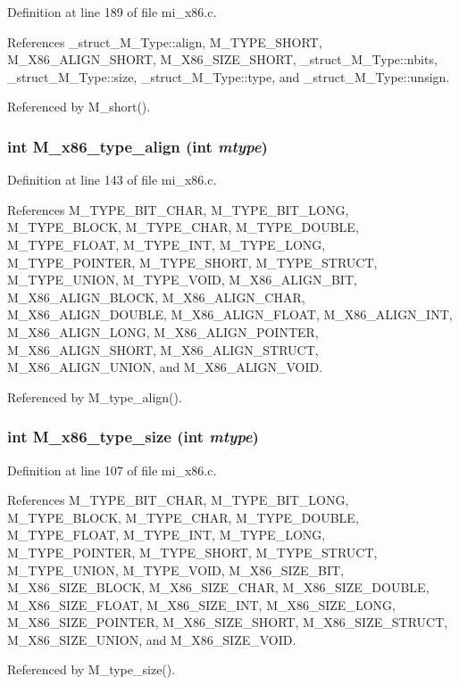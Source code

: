 Definition at line 189 of file mi\_\-x86.c.

References \_\-struct\_\-M\_\-Type::align, M\_\-TYPE\_\-SHORT, M\_\-X86\_\-ALIGN\_\-SHORT, M\_\-X86\_\-SIZE\_\-SHORT, \_\-struct\_\-M\_\-Type::nbits, \_\-struct\_\-M\_\-Type::size, \_\-struct\_\-M\_\-Type::type, and \_\-struct\_\-M\_\-Type::unsign.

Referenced by M\_\-short().
\subsubsection{\setlength{\rightskip}{0pt plus 5cm}int M\_\-x86\_\-type\_\-align (int {\em mtype})}\label{mi__x86_8c_41c11852de71a65093dfa7b06640e1ba}




Definition at line 143 of file mi\_\-x86.c.

References M\_\-TYPE\_\-BIT\_\-CHAR, M\_\-TYPE\_\-BIT\_\-LONG, M\_\-TYPE\_\-BLOCK, M\_\-TYPE\_\-CHAR, M\_\-TYPE\_\-DOUBLE, M\_\-TYPE\_\-FLOAT, M\_\-TYPE\_\-INT, M\_\-TYPE\_\-LONG, M\_\-TYPE\_\-POINTER, M\_\-TYPE\_\-SHORT, M\_\-TYPE\_\-STRUCT, M\_\-TYPE\_\-UNION, M\_\-TYPE\_\-VOID, M\_\-X86\_\-ALIGN\_\-BIT, M\_\-X86\_\-ALIGN\_\-BLOCK, M\_\-X86\_\-ALIGN\_\-CHAR, M\_\-X86\_\-ALIGN\_\-DOUBLE, M\_\-X86\_\-ALIGN\_\-FLOAT, M\_\-X86\_\-ALIGN\_\-INT, M\_\-X86\_\-ALIGN\_\-LONG, M\_\-X86\_\-ALIGN\_\-POINTER, M\_\-X86\_\-ALIGN\_\-SHORT, M\_\-X86\_\-ALIGN\_\-STRUCT, M\_\-X86\_\-ALIGN\_\-UNION, and M\_\-X86\_\-ALIGN\_\-VOID.

Referenced by M\_\-type\_\-align().
\subsubsection{\setlength{\rightskip}{0pt plus 5cm}int M\_\-x86\_\-type\_\-size (int {\em mtype})}\label{mi__x86_8c_266c4d063aea8822aa35ea838ce4db7c}




Definition at line 107 of file mi\_\-x86.c.

References M\_\-TYPE\_\-BIT\_\-CHAR, M\_\-TYPE\_\-BIT\_\-LONG, M\_\-TYPE\_\-BLOCK, M\_\-TYPE\_\-CHAR, M\_\-TYPE\_\-DOUBLE, M\_\-TYPE\_\-FLOAT, M\_\-TYPE\_\-INT, M\_\-TYPE\_\-LONG, M\_\-TYPE\_\-POINTER, M\_\-TYPE\_\-SHORT, M\_\-TYPE\_\-STRUCT, M\_\-TYPE\_\-UNION, M\_\-TYPE\_\-VOID, M\_\-X86\_\-SIZE\_\-BIT, M\_\-X86\_\-SIZE\_\-BLOCK, M\_\-X86\_\-SIZE\_\-CHAR, M\_\-X86\_\-SIZE\_\-DOUBLE, M\_\-X86\_\-SIZE\_\-FLOAT, M\_\-X86\_\-SIZE\_\-INT, M\_\-X86\_\-SIZE\_\-LONG, M\_\-X86\_\-SIZE\_\-POINTER, M\_\-X86\_\-SIZE\_\-SHORT, M\_\-X86\_\-SIZE\_\-STRUCT, M\_\-X86\_\-SIZE\_\-UNION, and M\_\-X86\_\-SIZE\_\-VOID.

Referenced by M\_\-type\_\-size().